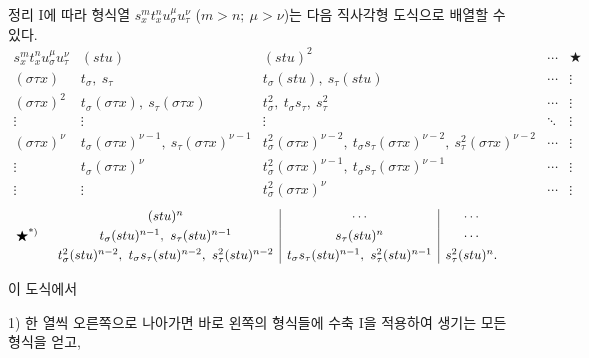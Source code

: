 정리 I에 따라 형식열 $s_x^m t_x^n u_\sigma^\mu u_\tau^\nu$ ($m>n;\ \mu>\nu$)는 다음 직사각형 도식으로 배열할 수 있다.
\begingroup\small
\[
\begin{array}{c|c|c|c|c}
s_x^m t_x^n u_\sigma^\mu u_\tau^\nu
& (stu)
& (stu)^2
& \cdots
& \bigstar\\[0.3em]
(\sigma\tau x)
& t_\sigma,\ s_\tau
& t_\sigma(stu),\ s_\tau(stu)
& \cdots
& \vdots\\[0.3em]
(\sigma\tau x)^2
& t_\sigma(\sigma\tau x),\ s_\tau(\sigma\tau x)
& t_\sigma^2,\ t_\sigma s_\tau,\ s_\tau^2
& \cdots
& \vdots\\[0.3em]
\vdots&\vdots&\vdots&\ddots&\vdots\\[0.3em]
(\sigma\tau x)^\nu
& t_\sigma(\sigma\tau x)^{\nu-1},\ s_\tau(\sigma\tau x)^{\nu-1}
& t_\sigma^2(\sigma\tau x)^{\nu-2},\ t_\sigma s_\tau(\sigma\tau x)^{\nu-2},\ s_\tau^2(\sigma\tau x)^{\nu-2}
& \cdots
& \vdots\\[0.3em]
\vdots
& t_\sigma(\sigma\tau x)^\nu
& t_\sigma^2(\sigma\tau x)^{\nu-1},\ t_\sigma s_\tau(\sigma\tau x)^{\nu-1}
& \cdots
& \vdots\\[0.3em]
\vdots
& \vdots
& t_\sigma^2(\sigma\tau x)^\nu
& \cdots
& \vdots
\end{array}
\]
\endgroup
\begingroup\small
\[
\begin{array}{r@{\quad}c}
\bigstar\srcfnmark{*)}
&
\begin{array}{c|c|c}
(stu)^n & \cdots & \cdots\\[0.3em]
t_\sigma(stu)^{n-1},\ s_\tau(stu)^{n-1}
& s_\tau(stu)^n & \cdots\\[0.3em]
t_\sigma^2(stu)^{n-2},\ t_\sigma s_\tau(stu)^{n-2},\ s_\tau^2(stu)^{n-2}
& t_\sigma s_\tau(stu)^{n-1},\ s_\tau^2(stu)^{n-1}
& s_\tau^2(stu)^n .
\end{array}
\end{array}
\]
\endgroup
{}

이 도식에서

1) 한 열씩 오른쪽으로 나아가면 바로 왼쪽의 형식들에 수축 I을 적용하여 생기는 모든 형식을 얻고,


